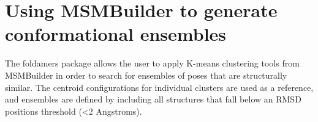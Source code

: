\documentclass[letterpaper,12pt,english,openany,oneside]{sphinxmanual}
\begin{document}
\section{Using MSMBuilder to generate conformational ensembles}
\label{\detokenize{ensembles:using-msmbuilder-to-generate-conformational-ensembles}}
The foldamers package allows the user to apply K-means clustering tools from MSMBuilder in order to search for ensembles of poses that are structurally similar.  The centroid configurations for individual clusters are used as a reference, and ensembles are defined by including all structures that fall below an RMSD positions threshold (\textless{}2 Angstroms).

\label{\detokenize{ensembles:module-ensembles.cluster}}

\begin{fulllineitems}
\label{\detokenize{ensembles:ensembles.cluster.concatenate_trajectories}}
\end{fulllineitems}


\begin{fulllineitems}
\label{\detokenize{ensembles:ensembles.cluster.align_structures}}
\end{fulllineitems}


\begin{fulllineitems}
\label{\detokenize{ensembles:ensembles.cluster.get_cluster_centroid_positions}}
\end{fulllineitems}
\end{document}
